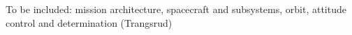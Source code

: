 \documentclass[PICOReport.tex]{subfiles}
\begin{document}
To be included: mission architecture, spacecraft and subsystems, orbit, attitude control and determination (Trangsrud)
\end{document}
